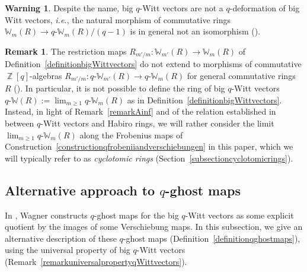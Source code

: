 \documentclass[10pt,twoside]{scrarticle}
\newlength{\mar} \setlength{\mar}{1cm}%
\newlength{\len}
\theoremstyle{definition}
\newtheorem{remark}[theorem]{Remark}
\newtheorem{warning}[theorem]{Warning}
\DeclareMathOperator{\Z}{\mathbb{Z}}
\newcommand{\W}{\mathbb{W}}
\newcommand{\qW}{q\text{-}\mathbb{W}}
\newcommand{\qWm}{q\text{-}\mathbb{W}_m}
\newcommand{\qWmm}{q\text{-}\mathbb{W}_{m'}}
\renewcommand{\ge}{\geqslant}
\numberwithin{equation}{theorem}
\begin{document}
\begin{warning}
    Despite the name, big $q$-Witt vectors are not a $q$-deformation of big Witt vectors, \textit{i.e.}, the natural morphism of commutative rings $\W_m(R) \rightarrow \qWm(R)/(q-1)$ is in general not an isomorphism (\cite[Remark~2.11]{wagner_q-witt_2024}).
\end{warning}

\begin{remark}\label{remarknorestriction} 
    The restriction maps $R_{m'/m} : \W_{m'}(R) \rightarrow \W_m(R)$ of Definition~\ref{definitionbigWittvectors} do not extend to morphisms of commutative $\Z[q]$-algebras $R_{m'/m} : \qWmm(R) \rightarrow \qWm(R)$ for general commutative rings $R$ (\cite[2.14]{wagner_q-witt_2024}). In particular, it is not possible to define the ring of big $q$-Witt vectors $\qW(R) := \lim_{m \ge 1} \qWm(R)$ as in Definition~\ref{definitionbigWittvectors}. Instead, in light of Remark~\ref{remarkAinf} and of the relation established in \cite[Section~2.2]{wagner_q-hodge_2025} between $q$-Witt vectors and Habiro rings, we will rather consider the limit $\lim_{m \ge 1} \qWm(R)$ along the Frobenius maps of Construction~\ref{constructionqfrobeniiandverschiebungen} in this paper, which we will typically refer to as \emph{cyclotomic rings} (Section~\ref{subsectioncyclotomicrings}).
\end{remark}


\subsection{Alternative approach to $q$-ghost maps}

In \cite[2.13]{wagner_q-witt_2024}, Wagner constructs $q$-ghost maps for the big $q$-Witt vectors as some explicit quotient by the images of some Verschiebung maps. In this subsection, we give an alternative description of these $q$-ghost maps (Definition~\ref{definitionqghostmaps}), using the universal property of big $q$-Witt vectors (Remark~\ref{remarkuniversalpropertyqWittvectors}). 
\end{document}
